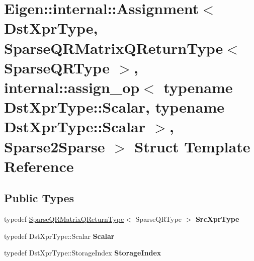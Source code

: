 \hypertarget{struct_eigen_1_1internal_1_1_assignment_3_01_dst_xpr_type_00_01_sparse_q_r_matrix_q_return_type_359637caee80b00c35b5e63bb0a6509c}{}\section{Eigen\+::internal\+::Assignment$<$ Dst\+Xpr\+Type, Sparse\+Q\+R\+Matrix\+Q\+Return\+Type$<$ Sparse\+Q\+R\+Type $>$, internal\+::assign\+\_\+op$<$ typename Dst\+Xpr\+Type\+::Scalar, typename Dst\+Xpr\+Type\+::Scalar $>$, Sparse2\+Sparse $>$ Struct Template Reference}
\label{struct_eigen_1_1internal_1_1_assignment_3_01_dst_xpr_type_00_01_sparse_q_r_matrix_q_return_type_359637caee80b00c35b5e63bb0a6509c}
\subsection*{Public Types}
\begin{DoxyCompactItemize}
\item 
\mbox{\label{struct_eigen_1_1internal_1_1_assignment_3_01_dst_xpr_type_00_01_sparse_q_r_matrix_q_return_type_359637caee80b00c35b5e63bb0a6509c_a93e5753112691850ff80b94096ba0726}} 
typedef \mbox{\hyperlink{struct_eigen_1_1_sparse_q_r_matrix_q_return_type}{Sparse\+Q\+R\+Matrix\+Q\+Return\+Type}}$<$ Sparse\+Q\+R\+Type $>$ {\bfseries Src\+Xpr\+Type}
\item 
\mbox{\label{struct_eigen_1_1internal_1_1_assignment_3_01_dst_xpr_type_00_01_sparse_q_r_matrix_q_return_type_359637caee80b00c35b5e63bb0a6509c_a23aebc524b5ccb1c9b8e5bb72f1c5e17}} 
typedef Dst\+Xpr\+Type\+::\+Scalar {\bfseries Scalar}
\item 
\mbox{\label{struct_eigen_1_1internal_1_1_assignment_3_01_dst_xpr_type_00_01_sparse_q_r_matrix_q_return_type_359637caee80b00c35b5e63bb0a6509c_a4c1abbabaa62775474fce84d579c40dc}} 
typedef Dst\+Xpr\+Type\+::\+Storage\+Index {\bfseries Storage\+Index}
\end{DoxyCompactItemize}
